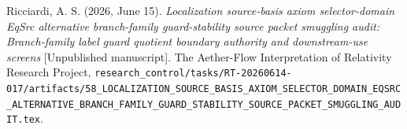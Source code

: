 \documentclass[11pt]{article}
\begin{document}
Ricciardi, A. S. (2026, June 15). \emph{Localization source-basis axiom
selector-domain EqSrc alternative branch-family guard-stability source
packet smuggling audit: Branch-family label guard quotient boundary
authority and downstream-use screens} [Unpublished manuscript]. The
Aether-Flow Interpretation of Relativity Research Project,
\texttt{research\_control/tasks/RT-20260614-017/artifacts/58\_LOCALIZATION\_SOURCE\_BASIS\_AXIOM\_SELECTOR\_DOMAIN\_EQSRC\_ALTERNATIVE\_BRANCH\_FAMILY\_GUARD\_STABILITY\_SOURCE\_PACKET\_SMUGGLING\_AUDIT.tex}.
\end{document}
